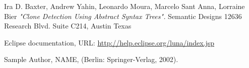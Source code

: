 \documentclass{report}
\begin{document}
\begin{thebibliography}{100}
 Ira D. Baxter, Andrew Yahin, Leonardo Moura, Marcelo Sant Anna, Lorraine Bier \emph{"Clone Detection Using Abstract Syntax Trees".} Semantic Designs 12636 Research Blvd. Suite C214, Austin Texas

 Eclipse documentation, URL: \url{http://help.eclipse.org/luna/index.jsp}



 Sample Author, NAME,
(Berlin: Springer-Verlag, 2002).

\end{thebibliography} 
\end{document}
